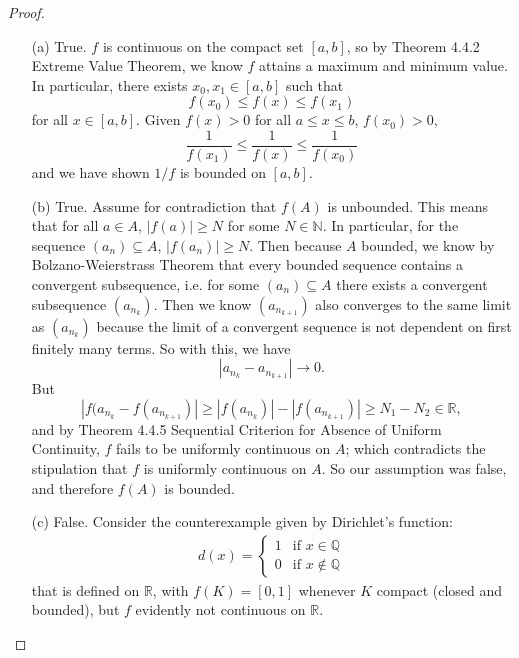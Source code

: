 \documentclass[11pt,twoside, reqno]{amsart}
\theoremstyle{remark}
\def\R{\mathbb R}
\def\Q{\mathbb Q}
\def\N{\mathbb N}
\begin{document}
\begin{proof}
\begin{enumerate}
    \item [(a)] True. $f$ is continuous on the compact set $[a,b]$, so by Theorem 4.4.2 Extreme Value Theorem, we know $f$ attains a maximum and minimum value. In particular, there exists $x_0,x_1 \in [a,b]$ such that 
    $$
        f(x_0) \leq f(x) \leq f(x_1)
    $$
    for all $x \in [a,b]$. Given $f(x) > 0$ for all $a \leq x \leq b$, $f(x_0) > 0$,
    $$
        \frac{1}{f(x_1)} \leq \frac{1}{f(x)} \leq \frac{1}{f(x_0)}
    $$
    and we have shown $1/f$ is bounded on $[a,b]$.
    \item [(b)] True. Assume for contradiction that $f(A)$ is unbounded. This means that for all $a \in A$, $|f(a)| \geq N$ for some $N \in \N$. In particular, for the sequence $(a_n) \subseteq A$, $|f(a_n)| \geq N$. Then because $A$ bounded, we know by Bolzano-Weierstrass Theorem that every bounded sequence contains a convergent subsequence, i.e. for some $(a_n) \subseteq A$ there exists a convergent subsequence $(a_{n_k})$. Then we know $(a_{n_{k+1}})$ also converges to the same limit as $(a_{n_k})$ because the limit of a convergent sequence is not dependent on first finitely many terms. So with this, we have
    $$
        |a_{n_k} - a_{n_{k+1}}| \to 0.
    $$
    But
    $$
        |f(a_{n_k} - f(a_{n_{k+1}})| \geq |f(a_{n_k})| - |f(a_{n_{k+1}})| \geq N_1 - N_2 \in \R,
    $$
    and by Theorem 4.4.5 Sequential Criterion for Absence of Uniform Continuity, $f$ fails to be uniformly continuous on $A$; which contradicts the stipulation that $f$ is uniformly continuous on $A$. So our assumption was false, and therefore $f(A)$ is bounded.
    \item [(c)] False. Consider the counterexample given by Dirichlet's function:
    \begin{align*}
        d(x) =
            \begin{cases}
                1 & \text{if $x \in \Q$} \\
                0 & \text{if $x \not \in \Q$}
            \end{cases}
    \end{align*}
    that is defined on $\R$, with $f(K) = [0,1]$ whenever $K$ compact (closed and bounded), but $f$ evidently not continuous on $\R$.
\end{enumerate}

\end{proof}
\end{document}
